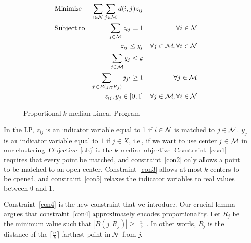 \begin{figure}
\begin{align}
	\label{obj} & \mbox{Minimize} & \sum_{i \in \mathcal {N}} \sum_{j \in \mathcal{M}} d(i, j) z_{ij} && \\
	\label{con1} & \mbox{Subject to} & \sum_{j \in \mathcal{M}} z_{ij} = 1 &  & \forall i \in \mathcal {N} \\
	\label{con2} && z_{ij} \leq y_j  &  & \forall j \in \mathcal{M}, \forall i \in \mathcal {N} \\
	\label{con3} && \sum_{j \in \mathcal{M}} y_j \leq k && \\
	\label{con4} && \sum_{j' \in B(j, \gamma R_j)} y_{j'} \geq 1 & & \forall j \in \mathcal{M} \\
	\label{con5} && z_{ij}, y_j \in [0, 1] & & \forall j \in \mathcal{M}, \forall i \in \mathcal {N}
\end{align} 
\caption{Proportional $k$-median Linear Program}
\label{fig:lp}
\end{figure}

In the LP, $z_{ij}$ is an indicator variable equal to 1 if $i \in \mathcal {N}$ is matched to $j \in \mathcal{M}$. $y_j$ is an indicator variable equal to $1$ if $j \in X$, i.e., if we want to use center $j \in \mathcal{M}$ in our clustering. Objective~\ref{obj} is the $k$-median objective. Constraint~\ref{con1} requires that every point be matched, and constraint~\ref{con2} only allows a point to be matched to an open center. Constraint~\ref{con3} allows at most $k$ centers to be opened, and constraint~\ref{con5} relaxes the indicator variables to real values between 0 and 1. 

Constraint~\ref{con4} is the new constraint that we introduce. Our crucial lemma argues that constraint~\ref{con4} approximately encodes proportionality. Let $R_j$ be the minimum value such that $|B(j, R_j)| \geq \lceil \frac{n}{k} \rceil$. In other words, $R_j$ is the distance of the $\lceil \frac{n}{k} \rceil$ farthest point in $\mathcal {N}$ from $j$.

